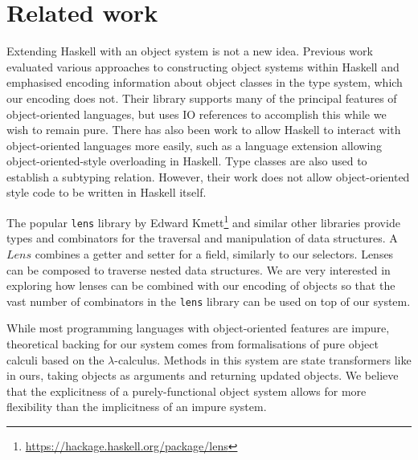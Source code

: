 

\section{Related work}
\label{sec:related}

Extending Haskell with an object system is not a new idea. Previous work evaluated various approaches to constructing object systems within Haskell and emphasised encoding information about object classes in the type system\cite{kiselyov2005haskell}, which our encoding does not. Their library supports many of the principal features of object-oriented languages, but uses IO references to accomplish this while we wish to remain pure. There has also been work to allow Haskell to interact with object-oriented languages more easily, such as a language extension allowing object-oriented-style overloading in Haskell\cite{shields2001object}. Type classes are also used to establish a subtyping relation. However, their work does not allow object-oriented style code to be written in Haskell itself.

The popular \texttt{lens} library by Edward Kmett\footnote{\url{https://hackage.haskell.org/package/lens}} and similar other libraries provide types and combinators for the traversal and manipulation of data structures. A $\mathit{Lens}$ combines a getter and setter for a field, similarly to our selectors. Lenses can be composed to traverse nested data structures. We are very interested in exploring how lenses can be combined with our encoding of objects so that the vast number of combinators in the \texttt{lens} library can be used on top of our system. 

While most programming languages with object-oriented features are impure, theoretical backing for our system comes from formalisations of pure object calculi based on the $\lambda$-calculus\citet{pierce1994simple}. Methods in this system are state transformers like in ours, taking objects as arguments and returning updated objects. We believe that the explicitness of a purely-functional object system allows for more flexibility than the implicitness of an impure system.


